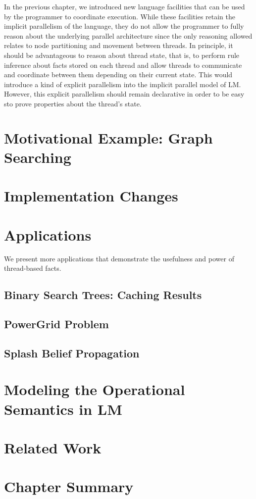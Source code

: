 In the previous chapter, we introduced new language facilities that can be used
by the programmer to coordinate execution. While these facilities retain the
implicit parallelism of the language, they do not allow the programmer to fully
reason about the underlying parallel architecture since the only reasoning
allowed relates to node partitioning and movement between threads. In principle,
it should be advantageous to reason about thread state, that is, to perform rule
inference about facts stored on each thread and allow threads to communicate and
coordinate between them depending on their current state. This would introduce a
kind of explicit parallelism into the implicit parallel model of LM.
However, this explicit parallelism should remain declarative in order to be easy
sto prove properties about the thread's state.

\section{Motivational Example: Graph Searching}


\section{Implementation Changes}


\section{Applications}

We present more applications that demonstrate the usefulness and power of thread-based facts.

\subsection{Binary Search Trees: Caching Results}


\subsection{PowerGrid Problem}


\subsection{Splash Belief Propagation}\label{sec:coordination:bp}


\section{Modeling the Operational Semantics in LM}


\section{Related Work}


\section{Chapter Summary}

